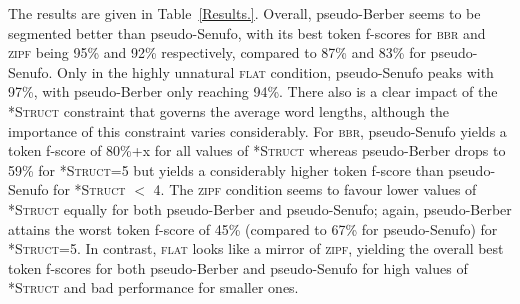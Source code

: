 \documentclass[11pt]{article}
\begin{document}
The results are given in Table~\ref{Results.}. Overall, pseudo-Berber seems to be segmented better than pseudo-Senufo, with its best token f-scores for \textsc{bbr} and \textsc{zipf} being 95\% and 92\% respectively, compared to 87\% and 83\% for pseudo-Senufo. Only in the highly unnatural \textsc{flat} condition, pseudo-Senufo peaks with 97\%, with pseudo-Berber only reaching 94\%. There also is a clear impact of the \textsc{*Struct} constraint that governs the average word lengths, although the importance of this constraint varies considerably. For \textsc{bbr}, pseudo-Senufo yields a token f-score of 80\%+x for all values of \textsc{*Struct} whereas pseudo-Berber drops to 59\% for \textsc{*Struct}=5 but yields a considerably higher token f-score than pseudo-Senufo for \textsc{*Struct} $<$ 4. The \textsc{zipf} condition seems to favour lower values of \textsc{*Struct} equally for both pseudo-Berber and pseudo-Senufo; again, pseudo-Berber attains the worst token f-score of 45\% (compared to 67\% for pseudo-Senufo) for \textsc{*Struct}=5. In contrast, \textsc{flat} looks like a mirror of \textsc{zipf}, yielding the overall best token f-scores for both pseudo-Berber and pseudo-Senufo for high values of \textsc{*Struct} and bad performance for smaller ones.

\end{document}

